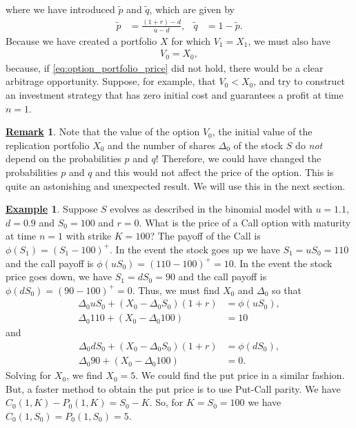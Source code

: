 \documentclass[12pt]{book}
\numberwithin{equation}{chapter}
\theoremstyle{plain}
\numberwithin{theorem}{section}
\theoremstyle{definition}
\newtheorem{example}[theorem]{\underline{Example}}
\newtheorem{remark}[theorem]{\underline{Remark}}
\numberwithin{exercise}{chapter}
\newcommand{\<}{\langle}
\renewcommand{\>}{\rangle}
\renewcommand{\(}{\left(}
\renewcommand{\)}{\right)}
\renewcommand{\[}{\left[}
\renewcommand{\]}{\right]}
\newcommand\Del{\Delta}
\newcommand\qt{\widetilde{q}}
\theoremstyle{definition}
\numberwithin{question}{section}
\newcommand\pt{\widetilde{p}}
\begin{document}
where we have introduced $\pt$ and $\qt$, which are given by
\begin{align}
	\pt &= \frac{(1+r) - d}{u - d},  &
	\qt &= 1 - \pt. \label{eq:pt}
\end{align}
Because we have created a portfolio $X$ for which $V_1 = X_1$, we must also have
\begin{align} 
	V_0 = X_0 , \label{eq:option_portfolio_price}
\end{align}
because, if \eqref{eq:option_portfolio_price} did not hold, there would be a clear arbitrage opportunity. Suppose, for example, that $V_0 < X_0$, and try to construct an investment strategy that has zero initial cost and guarantees a profit at time $n=1$.

\begin{remark}
\label{rmk:pq}
Note that the value of the option $V_0$, the initial value of the replication portfolio $X_0$ and the number of shares $\Del_0$ of the stock $S$ do \textit{not} depend on the probabilities $p$ and $q$!  Therefore, we could have changed the probabilities $p$ and $q$ and this would not affect the price of the option.  This is quite an astonishing and unexpected result.  We will use this in the next section.
\end{remark}

\begin{example}
Suppose $S$ evolves as described in the binomial model with $u=1.1$, $d=0.9$ and $S_0=100$ and $r=0$.  What is the price of a Call option with maturity at time $n=1$ with strike $K=100$?  The payoff of the Call is $\phi(S_1) = (S_1 - 100)^+$.  In the event the stock goes up we have $S_1 = u S_0 = 110$ and the call payoff is $\phi(uS_0)=(110 - 100)^+ = 10$.  In the event the stock price goes down, we have $S_1 = d S_0 = 90$ and the call payoff is $\phi(dS_0)=(90 - 100)^+ = 0$.  Thus, we must find $X_0$ and $\Del_0$ so that
\begin{align}
\Delta_0 u S_0 + (X_0 - \Delta_0 S_0) (1+r)
	&= \phi(uS_0) , \\
\Delta_0 110 + (X_0 - \Delta_0 100) 
	&= 10
\end{align}
and
\begin{align}
\Delta_0 d S_0 + (X_0 - \Delta_0 S_0) (1+r)
	&= \phi(dS_0) , \\
\Delta_0 90 + (X_0 - \Delta_0 100)
	&= 0 .
\end{align}
Solving for $X_0$, we find $X_0 = 5$.  We could find the put price in a similar fashion.  But, a faster method to obtain the put price is to use Put-Call parity.  We have $C_0(1,K) - P_0(1,K) = S_0 - K$. So, for $K=S_0=100$ we have $C_0(1,S_0) = P_0(1,S_0) = 5$.
\end{example}
\end{document}
